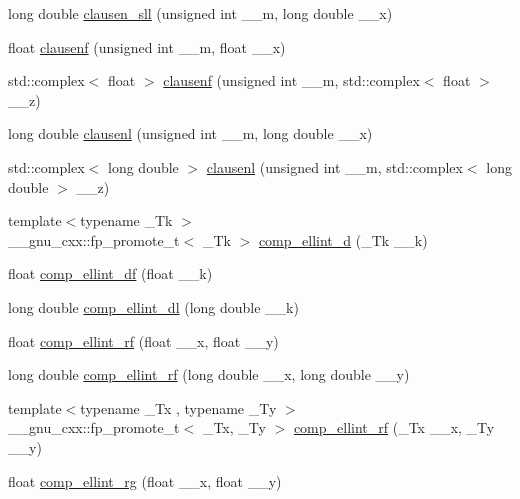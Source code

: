 \begin{DoxyCompactItemize}
\item 
long double \hyperlink{group__mathsf__gnu_ga227d105b4c0659c4402de7217bb9b65b}{clausen\+\_\+sll} (unsigned int \+\_\+\+\_\+m, long double \+\_\+\+\_\+x)
\item 
float \hyperlink{group__mathsf__gnu_ga6422bdec1a3c930fb1623094cd2eaff2}{clausenf} (unsigned int \+\_\+\+\_\+m, float \+\_\+\+\_\+x)
\item 
std\+::complex$<$ float $>$ \hyperlink{group__mathsf__gnu_ga98b5ba1e5de4ef2e0e9422ac8d9ce2ad}{clausenf} (unsigned int \+\_\+\+\_\+m, std\+::complex$<$ float $>$ \+\_\+\+\_\+z)
\item 
long double \hyperlink{group__mathsf__gnu_ga33132bab39c8d78dde807b45fc06de52}{clausenl} (unsigned int \+\_\+\+\_\+m, long double \+\_\+\+\_\+x)
\item 
std\+::complex$<$ long double $>$ \hyperlink{group__mathsf__gnu_gae39368808280f5c1b80dce7c2f4a67a7}{clausenl} (unsigned int \+\_\+\+\_\+m, std\+::complex$<$ long double $>$ \+\_\+\+\_\+z)
\item 
{\footnotesize template$<$typename \+\_\+\+Tk $>$ }\\\+\_\+\+\_\+gnu\+\_\+cxx\+::fp\+\_\+promote\+\_\+t$<$ \+\_\+\+Tk $>$ \hyperlink{group__mathsf__gnu_ga3fe79a91524b43ffc5ffb83c0eb2bd00}{comp\+\_\+ellint\+\_\+d} (\+\_\+\+Tk \+\_\+\+\_\+k)
\item 
float \hyperlink{group__mathsf__gnu_ga34ac6488b0e7531d5d4b7a8e31ff864e}{comp\+\_\+ellint\+\_\+df} (float \+\_\+\+\_\+k)
\item 
long double \hyperlink{group__mathsf__gnu_ga494931ec0a271b79f1fdcfdf929e3138}{comp\+\_\+ellint\+\_\+dl} (long double \+\_\+\+\_\+k)
\item 
float \hyperlink{group__mathsf__gnu_ga55ae30b4f8ff15017d18a80050e14e38}{comp\+\_\+ellint\+\_\+rf} (float \+\_\+\+\_\+x, float \+\_\+\+\_\+y)
\item 
long double \hyperlink{group__mathsf__gnu_gae1d468487f1711e91719a9c6392f3c35}{comp\+\_\+ellint\+\_\+rf} (long double \+\_\+\+\_\+x, long double \+\_\+\+\_\+y)
\item 
{\footnotesize template$<$typename \+\_\+\+Tx , typename \+\_\+\+Ty $>$ }\\\+\_\+\+\_\+gnu\+\_\+cxx\+::fp\+\_\+promote\+\_\+t$<$ \+\_\+\+Tx, \+\_\+\+Ty $>$ \hyperlink{group__mathsf__gnu_gaf6450c88127cf771acfc0667914266d1}{comp\+\_\+ellint\+\_\+rf} (\+\_\+\+Tx \+\_\+\+\_\+x, \+\_\+\+Ty \+\_\+\+\_\+y)
\item 
float \hyperlink{group__mathsf__gnu_ga978f8eec6e5edc918b243925dbacb65b}{comp\+\_\+ellint\+\_\+rg} (float \+\_\+\+\_\+x, float \+\_\+\+\_\+y)

\end{DoxyCompactItemize}
